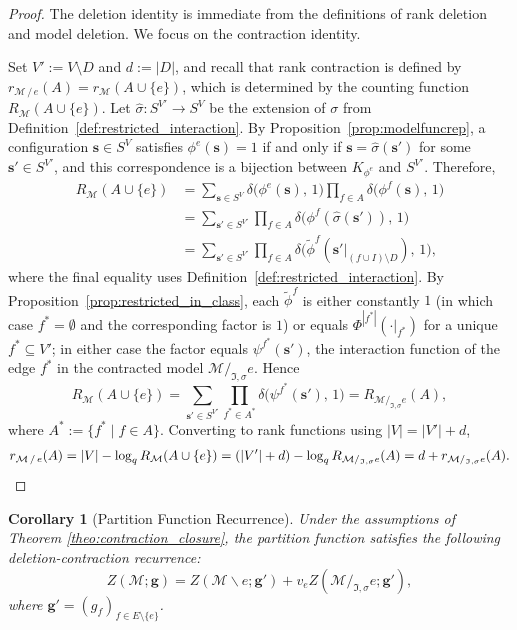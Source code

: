 \documentclass[11pt,reqno]{amsart}
\newcommand{\vecs}{\boldsymbol{s}}
\newcommand{\vecg}{\boldsymbol{g}}
\newcommand{\Mo}{\mathcal{M}}
\newcommand{\IFam}{\mathfrak{I}}
\theoremstyle{plain}
\newtheorem{corollary}[theorem]{Corollary}
\theoremstyle{definition}
\numberwithin{equation}{section}
\begin{document}
\begin{proof}
The deletion identity is immediate from the definitions of rank deletion and model deletion. We focus on the contraction identity.

Set $V' := V \setminus D$ and $d := |D|$, and recall that rank contraction is defined by $r_{\Mo \, / \, e}(A) = r_{\Mo}(A \cup \{e\})$, which is determined by the counting function $R_{\Mo}(A \cup \{e\})$. Let $\hat\sigma \colon S^{V'} \to S^{V}$ be the extension of $\sigma$ from Definition~\ref{def:restricted_interaction}. By Proposition~\ref{prop:modelfuncrep}, a configuration $\vecs \in S^{V}$ satisfies $\phi^e(\vecs) = 1$ if and only if $\vecs = \hat\sigma(\vecs')$ for some $\vecs' \in S^{V'}$, and this correspondence is a bijection between $K_{\phi^e}$ and $S^{V'}$. Therefore,
\begin{align*}
    R_{\Mo}(A \cup \{e\})
    &= \sum_{\vecs \in S^{V}} \delta\big(\phi^e(\vecs),\, 1\big) \prod_{f \in A} \delta\big(\phi^f(\vecs),\, 1\big) \\
    &= \sum_{\vecs' \in S^{V'}} \prod_{f \in A} \delta\big(\phi^f(\hat\sigma(\vecs')),\, 1\big) \\
    &= \sum_{\vecs' \in S^{V'}} \prod_{f \in A} \delta\big(\widetilde\phi^f(\vecs'|_{(f \cup I) \setminus D}),\, 1\big),
\end{align*}
where the final equality uses Definition~\ref{def:restricted_interaction}. By Proposition~\ref{prop:restricted_in_class}, each $\widetilde\phi^f$ is either constantly $1$ (in which case $f^* = \emptyset$ and the corresponding factor is $1$) or equals $\Phi^{|f^*|}(\cdot|_{f^*})$ for a unique $f^* \subseteq V'$; in either case the factor equals $\psi^{f^*}(\vecs')$, the interaction function of the edge $f^*$ in the contracted model $\Mo /_{\IFam,\sigma} e$. Hence
\[
    R_{\Mo}(A \cup \{e\})
    = \sum_{\vecs' \in S^{V'}} \prod_{f^* \in A^*} \delta\big(\psi^{f^*}(\vecs'),\, 1\big)
    = R_{\Mo /_{\IFam,\sigma} e}(A),
\]
where $A^* := \{ f^* \mid f \in A \}$. Converting to rank functions using $|V| = |V'| + d$,
\[
    r_{\Mo \, / \, e}(A)
    = |V| - \log_q R_{\Mo}(A \cup \{e\})
    = (|V'| + d) - \log_q R_{\Mo /_{\IFam,\sigma} e}(A)
    = d + r_{\Mo /_{\IFam,\sigma} e}(A). \qedhere
\]
\end{proof}
\begin{corollary}[Partition Function Recurrence]
\label{cor:partition_delcon}
    Under the assumptions of Theorem \ref{theo:contraction_closure}, the partition function satisfies the following deletion-contraction recurrence:
    \[
    Z(\Mo; \vecg) = Z(\Mo \backslash e; \vecg') + v_e Z(\Mo/_{\IFam,\sigma}e; \vecg'),
    \]
    where $\vecg' = (g_f)_{f \in E \setminus \{e\}}$.
\end{corollary}
\end{document}
